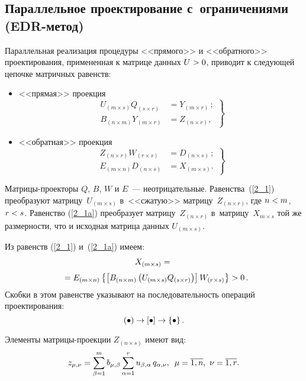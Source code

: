 \begin{multicols}{2}
\section{Параллельное проектирование с~ограничениями (EDR-метод)}

Параллельная реализация  процедуры <<прямого>> и <<обратного>> 
проектирования, примененная к матрице данных $U \hm> 0$,  приводит к 
следующей цепочке матричных равенств:
\begin{itemize}
  \item <<прямая>> проекция
\begin{equation}
\left.
\begin{array}{rl}
U_{(m \times s)} Q_{(s \times r)} &= Y_{(m \times r)}\,;\\[6pt]
B_{(n \times m)}  Y_{(m \times r)} &= Z_{(n \times r)},
\end{array}
\right\}
\label{2_1}
\end{equation}
  \item <<обратная>> проекция
\begin{equation}
\left.
\begin{array}{rl}
Z_{(n \times r)} W_{(r \times s)} &= D_{(n \times s)}\,;\\[6pt]
 E_{(m \times n)}  D_{(n \times s)}& = X_{(m \times s)}.
\end{array}
\right\}
\label{2_1a}
\end{equation}
\end{itemize}
Матрицы-проекторы $Q$, $B$, $W$ и $E$~--- неотрицательные.
Равенства~(\ref{2_1}) преобразуют матрицу~$U_{(m \times s)}$ в~<<сжатую>> 
матрицу~$Z_{(n \times r)}$, где $n \hm< m$, $r \hm< s$. Равенство 
(\ref{2_1a}) преобразует мат\-ри\-цу~$Z_{(n \times r)}$ в~мат\-ри\-цу~$X_{{m \times 
s}}$ той же размерности, что и исходная матрица данных $U_{(m \times s)}$.

Из равенств (\ref{2_1}) и~(\ref{2_1a}) имеем:
\begin{multline*}
X_{(m \times s)} = {}\\[3pt]
{}=E_{(m \times n)} \left\{\left[B_{(n \times m)} \left(U_{(m 
\times s)} Q_{(s \times r)}\right)\right] W_{(r \times s)}\right\} > 0\,.\hspace*{-3.59842pt}
\end{multline*}
Скобки в этом равенстве указывают на последовательность операций 
проектирования: 
$$
(\bullet) \hm\rightarrow [\bullet] \hm\rightarrow 
\left\{\bullet\right\}.
$$

Элементы матрицы-проекции $Z_{(n \times s)}$ имеют вид:
\begin{equation*}
z_{\mu,\nu} = \sum\limits^m_{\beta=1} b_{\mu,\beta} \sum\limits^r_{\alpha=1} 
u_{\beta,\alpha}\,q_{\alpha,\nu},\enskip \mu = \overline{1,n},\ \nu = 
\overline{1,r}.
\end{equation*}


\end{multicols}
